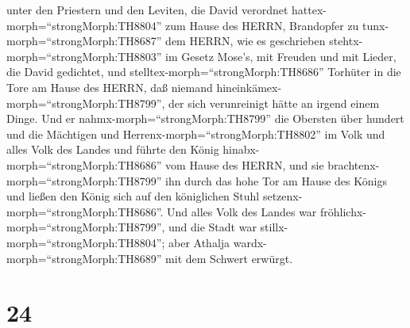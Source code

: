 unter den Priestern und den Leviten, die David verordnet
hattex-morph=``strongMorph:TH8804'' zum Hause des HERRN, Brandopfer zu
tunx-morph=``strongMorph:TH8687'' dem HERRN, wie es geschrieben
stehtx-morph=``strongMorph:TH8803'' im Gesetz Mose's, mit Freuden und
mit Lieder, die David gedichtet,  und
stelltex-morph=``strongMorph:TH8686'' Torhüter in die Tore am Hause des
HERRN, daß niemand hineinkämex-morph=``strongMorph:TH8799'', der sich
verunreinigt hätte an irgend einem Dinge.  Und er
nahmx-morph=``strongMorph:TH8799'' die Obersten über hundert und die
Mächtigen und Herrenx-morph=``strongMorph:TH8802'' im Volk und alles
Volk des Landes und führte den König hinabx-morph=``strongMorph:TH8686''
vom Hause des HERRN, und sie brachtenx-morph=``strongMorph:TH8799'' ihn
durch das hohe Tor am Hause des Königs und ließen den König sich auf den
königlichen Stuhl setzenx-morph=``strongMorph:TH8686''. 
Und alles Volk des Landes war fröhlichx-morph=``strongMorph:TH8799'',
und die Stadt war stillx-morph=``strongMorph:TH8804''; aber Athalja
wardx-morph=``strongMorph:TH8689'' mit dem Schwert erwürgt.

\hypertarget{section-23}{%
\section{24}\label{section-23}}

